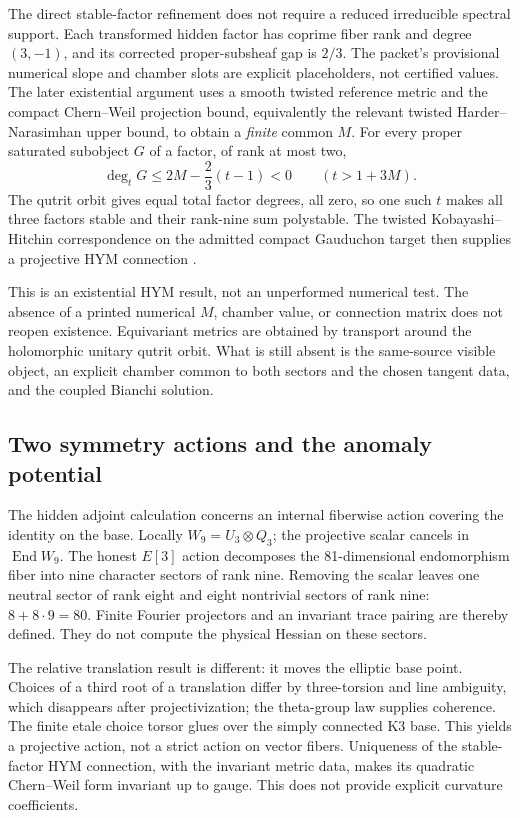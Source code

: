 \documentclass[11pt]{article}
\theoremstyle{definition}
\theoremstyle{remark}
\begin{document}
The direct stable-factor refinement \cite{FRG3U} does not require a reduced
irreducible spectral support.  Each transformed hidden factor has coprime
fiber rank and degree \((3,-1)\), and its corrected proper-subsheaf gap is
\(2/3\).  The packet's provisional numerical slope and chamber slots are
explicit placeholders, not certified values.  The later existential
argument \cite{FRG3V} uses a smooth twisted reference metric and the
compact Chern--Weil projection bound, equivalently the relevant twisted
Harder--Narasimhan upper bound, to obtain a \emph{finite} common \(M\).
For every proper saturated subobject \(G\) of a factor, of rank at most two,
\[
\deg_tG\le2M-\frac23(t-1)<0\qquad(t>1+3M).
\]
The qutrit orbit gives equal total factor degrees, all zero, so one such
\(t\) makes all three factors stable and their rank-nine sum polystable.
The twisted Kobayashi--Hitchin correspondence on the admitted compact
Gauduchon target then supplies a projective HYM connection
\cite{LiYau1987,Perego2019}.

This is an existential HYM result, not an unperformed numerical test.
The absence of a printed numerical \(M\), chamber value, or connection matrix
does not reopen existence.  Equivariant metrics are obtained by transport
around the holomorphic unitary qutrit orbit.  What is still absent is the
same-source visible object, an explicit chamber common to both sectors and
the chosen tangent data, and the coupled Bianchi solution.

\subsection{Two symmetry actions and the anomaly potential}
\label{sec:symmetry-bc}

The hidden adjoint calculation \cite{FRAdjoint} concerns an internal
fiberwise action covering the identity on the base.  Locally
\(W_9=U_3\otimes Q_3\); the projective scalar cancels in
\(\operatorname{End}W_9\).  The honest \(E[3]\) action decomposes the
81-dimensional endomorphism fiber into nine character sectors of rank nine.
Removing the scalar leaves one neutral sector of rank eight and eight
nontrivial sectors of rank nine: \(8+8\cdot9=80\).  Finite Fourier
projectors and an invariant trace pairing are thereby defined.  They do not
compute the physical Hessian on these sectors.

The relative translation result \cite{FRG3W} is different: it moves the
elliptic base point.  Choices of a third root of a translation differ by
three-torsion and line ambiguity, which disappears after projectivization;
the theta-group law supplies coherence.  The finite etale choice torsor
glues over the simply connected K3 base.  This yields a projective action,
not a strict action on vector fibers.  Uniqueness of the stable-factor HYM
connection, with the invariant metric data, makes its quadratic Chern--Weil
form invariant up to gauge.  This does not provide explicit curvature
coefficients.
\end{document}
